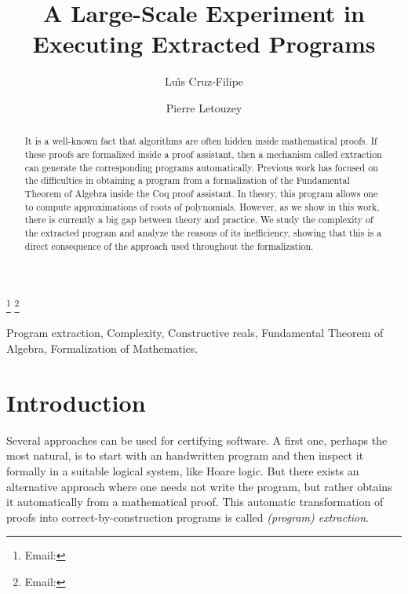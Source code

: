 \documentclass{entcs}
\begin{document}
\begin{frontmatter}
\title{A Large-Scale Experiment in Executing Extracted Programs}
\author{Lu\'\i s Cruz-Filipe}
\address{CLC, Lisbon, Portugal}

\author{Pierre Letouzey}
\address{Mathematisches Institut, LMU Munich, Germany}

\thanks[lcfemail]{Email:\href{mailto:lcfilipe@gmail.com}{\texttt{}}}
\thanks[plemail]{Email:\href{mailto:letouzey@lri.fr}{\texttt{}}}

\begin{abstract}
It is a well-known fact that algorithms are often hidden inside
mathematical proofs. If these proofs are formalized inside a proof
assistant, then a mechanism called extraction can generate the
corresponding programs automatically.  Previous work has focused on the
difficulties in obtaining a program from a
formalization of the Fundamental Theorem of Algebra inside the Coq
proof assistant. In theory, this program allows one to compute
approximations of roots of polynomials. However, as we show in this
work, there is currently a big gap between theory and practice.
We study the complexity of the extracted program and analyze the reasons
of its inefficiency, showing that this is a direct consequence of the
approach used throughout the formalization.
\end{abstract}

\begin{keyword}
Program extraction, Complexity, Constructive reals,
Fundamental Theorem of Algebra, Formalization of Mathematics.
\end{keyword}

\end{frontmatter}


\section{Introduction}

Several approaches can be used for certifying software. A first one,
perhaps the most natural, is to start with an handwritten program and
then inspect it formally in a suitable logical system, like Hoare
logic. But there exists an alternative approach where one needs not
write the program, but rather obtains it automatically from a
mathematical proof. This automatic transformation of proofs into
correct-by-construction programs is called {\it (program) extraction}.
\end{document}
